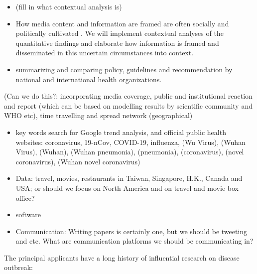 
\begin{itemize}
\item{(fill in what contextual analysis is)}
\item{How media content and information are framed are often socially and politically cultivated \citep{}. We will implement contextual analyses of the quantitative findings and elaborate how information is framed and disseminated in this uncertain circumstances into context.}
\item{summarizing and comparing policy, guidelines and recommendation by national and international health organizations.}
\end{itemize}

(Can we do this?: incorporating media coverage, public and institutional reaction and report (which can be based on modelling results by scientific community and WHO etc), time travelling and spread network (geographical)

\begin{itemize}
\item{key words search for Google trend analysis, and official public health websites: coronavirus, 19-nCov, COVID-19, influenza, (Wu Virus), (Wuhan Virus), (Wuhan), (Wuhan pneumonia), (pneumonia), (coronavirus), (novel coronavirus), (Wuhan novel coronavirus)}
\end{itemize}

\begin{itemize}
\item{Data: travel, movies, restaurants in Taiwan, Singapore, H.K., Canada and USA; or should we focus on North America and on travel and movie box office?}
\end{itemize}


\begin{itemize}
\item{software}
\item{Communication: Writing papers is certainly one, but we should be tweeting and etc. What are communication platforms we should be communicating in?}
\end{itemize}



The principal applicants have a long history of influential research on disease outbreak: 

